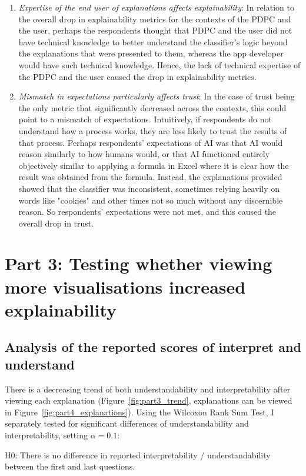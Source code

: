 \begin{enumerate}
    \item \textit{Expertise of the end user of explanations affects explainability}: In relation to the overall drop in explainability metrics for the contexts of the PDPC and the user, perhaps the respondents thought that PDPC and the user did not have technical knowledge to better understand the classifier's logic beyond the explanations that were presented to them, whereas the app developer would have such technical knowledge. Hence, the lack of technical expertise of the PDPC and the user caused the drop in explainability metrics.
    \item \textit{Mismatch in expectations particularly affects trust}: In the case of trust being the only metric that significantly decreased across the contexts, this could point to a mismatch of expectations. Intuitively, if respondents do not understand how a process works, they are less likely to trust the results of that process. Perhaps respondents' expectations of AI was that AI would reason similarly to how humans would, or that AI functioned entirely objectively similar to applying a formula in Excel where it is clear how the result was obtained from the formula. Instead, the explanations provided showed that the classifier was inconsistent, sometimes relying heavily on words like "cookies" and other times not so much without any discernible reason. So respondents' expectations were not met, and this caused the overall drop in trust.
\end{enumerate}

\section{Part 3: Testing whether viewing more visualisations increased explainability}
\subsection{Analysis of the reported scores of interpret and understand}
\label{sec:interpret_understand}
There is a decreasing trend of both understandability and interpretability after viewing each explanation (Figure~\ref{fig:part3_trend}, explanations can be viewed in Figure~\ref{fig:part4_explanations}). Using the Wilcoxon Rank Sum Test, I separately tested for significant differences of understandability and interpretability, setting $\alpha = 0.1$: 

\noindent H0: There is no difference in reported interpretability / understandability between the first and last questions.

